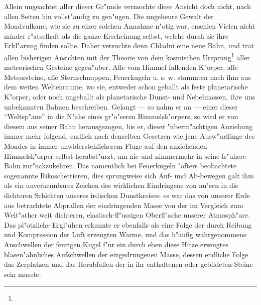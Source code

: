 \documentclass[a4paper, 8pt, oneside, polutonikogreek, german]{article}
\begin{document}
Allein ungeachtet aller dieser Gr"unde vermochte diese Ansicht doch nicht, nach allen Seiten hin vollst"andig zu gen"ugen. Die ungeheure Gewalt der Mondvulkane, wie sie zu einer solchen Annahme n"otig war, erschien Vielen nicht minder r"atselhaft als die ganze Erscheinung selbst, welche durch sie ihre Erkl"arung finden sollte. Daher versuchte denn Chladni eine neue Bahn, und trat allen bisherigen Ansichten mit der Theorie von dem kosmischen Ursprung\footnote{} aller meteorischen Gesteine gegen"uber. Alle vom Himmel fallenden K"orper, alle Meteorsteine, alle Sternschnuppen, Feuerkugeln u. s. w. stammten nach ihm aus dem weiten Weltenraume, wo sie, entweder schon geballt als feste planetarische K"orper, oder noch ungeballt als planetarische Dunst- und Nebelmassen, ihre uns unbekannten Bahnen beschreiben. Gelangt --- so nahm er an --- einer dieser "`Weltsp"ane"' in die N"ahe eines gr"o"seren Himmelsk"orpers, so wird er von diesem aus seiner Bahn herausgezogen, bis er, dieser "uberm"achtigen Anziehung immer mehr folgend, endlich nach denselben Gesetzen wie jene Ausw"urflinge des Mondes in immer unwiderstehlicherem Fluge auf den anziehenden Himmelsk"orper selbst herabst"urzt, um nie und nimmermehr in seine fr"uhere Bahn zur"uckzukehren. Das namentlich bei Feuerkugeln "ofters beobachtete sogenannte Rikoschettieren, dies sprungweise sich Auf- und Ab-bewegen galt ihm als ein unverkennbares Zeichen des wirklichen Eindringens von au"sen in die dichteren Schichten unseres irdischen Dunstkreises: es war das von unserer Erde aus betrachtete Abprallen der eindringenden Masse von der im Vergleich zum Welt"ather weit dichteren, elastisch-fl"ussigen Oberfl"ache unserer Atmosph"are. Das pl"otzliche Ergl"uhen erkannte er ebenfalls als eine Folge der durch Reibung und Kompression der Luft erzeugten Warme, und das h"aufig wahrgenommene Anschwellen der feurigen Kugel f"ur ein durch eben diese Hitze erzeugtes blasen"ahnliches Aufschwellen der eingedrungenen Masse, dessen endliche Folge das Zerplatzen und das Herabfallen der in ihr enthaltenen oder gebildeten Steine sein musste.
\end{document}
